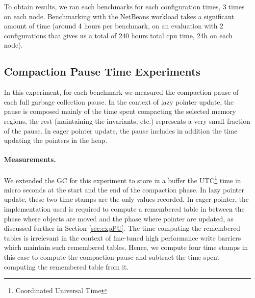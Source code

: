\documentclass[sigplan,10pt,screen]{acmart}\settopmatter{printfolios=true,printccs=true,printacmref=true}
\begin{document}
To obtain results, we ran each benchmarks for each configuration \numRuns times, 3 times on each node. Benchmarking with the NetBeans workload takes a significant amount of time (around 4 hours per benchmark, on an evaluation with 2 configurations that gives us a total of 240 hours total cpu time, 24h on each node).

\subsection{Compaction Pause Time Experiments}

In this experiment, for each benchmark we measured the compaction pause of each full garbage collection pause. In the context of lazy pointer update, the pause is composed mainly of the time spent compacting the selected memory regions, the rest (maintaining the invariants, etc.) represents a very small fraction of the pause. In eager pointer update, the pause includes in addition the time updating the pointers in the heap.

\paragraph{Measurements.}
We extended the GC for this experiment to store in a buffer the UTC\footnote{Coordinated Universal Time} time in micro seconds at the start and the end of the compaction phase. In lazy pointer update, these two time stamps are the only values recorded. In eager pointer, the implementation used is required to compute a remembered table in between the phase where objects are moved and the phase where pointer are updated, as discussed further in Section \ref{sec:expPU}. The time computing the remembered tables is irrelevant in the context of fine-tuned high performance write barriers which maintain such remembered tables. Hence, we compute four time stamps in this case to compute the compaction pause and subtract the time spent computing the remembered table from it.

\newcommand{\rulesep}{\unskip\ \vrule\ }
\end{document}
